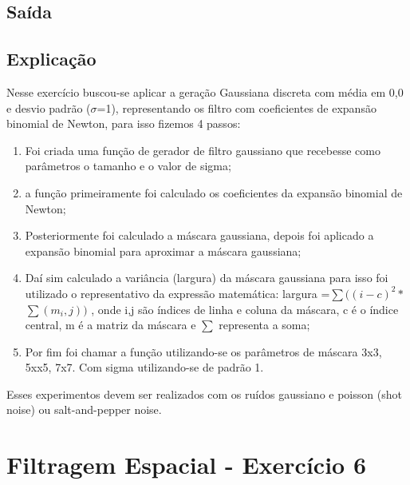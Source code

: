 \documentclass[10pt,a4paper]{article}
\begin{document}
\subsection{Saída}



\subsection{Explicação}

\begin{flushleft}
Nesse exercício buscou-se aplicar a geração Gaussiana discreta com média em 0,0 e desvio padrão {(\(\sigma\)=1)}, representando os filtro com coeficientes de expansão binomial de Newton, para isso fizemos 4 passos: 
\end{flushleft}

\begin{enumerate}[label=\alph*.]
   \item Foi criada uma função de gerador de filtro gaussiano que recebesse como parâmetros o tamanho e o valor de sigma;
   \item a função primeiramente foi calculado os coeficientes da expansão binomial de Newton;
   \item Posteriormente foi calculado a máscara gaussiana, depois foi aplicado a expansão binomial para aproximar a máscara gaussiana;
   \item Daí sim calculado a variância (largura) da máscara gaussiana para isso foi utilizado o representativo da expressão matemática: largura =\(\sum{((i - c)^2 *}\) \(\sum{(m_i,j))}\) , onde i,j são índices de linha e coluna da máscara, c é o índice central, m é a matriz da máscara e \(\sum\) representa a soma;
   \item Por fim foi chamar a função utilizando-se os parâmetros de máscara 3x3, 5xx5, 7x7. Com sigma utilizando-se de padrão 1.
\end{enumerate}

\begin{flushleft}
Esses experimentos devem ser realizados com os ruídos gaussiano e poisson (shot noise) ou salt-and-pepper noise. 
\end{flushleft}

\pagebreak

\section{Filtragem Espacial - Exercício 6}
\end{document}
